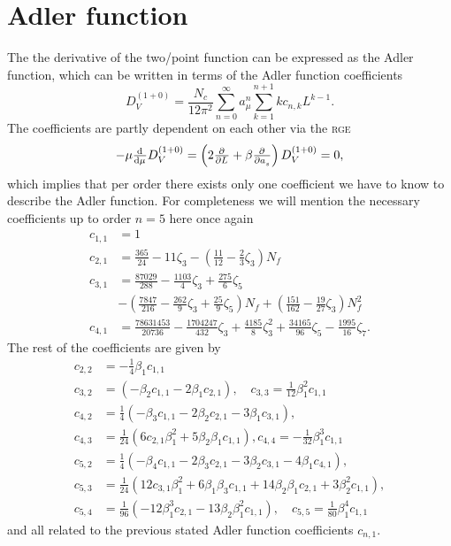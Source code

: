 \documentclass[../../index.tex]{subfiles}
\begin{document}
  \section{Adler function}
  The the derivative of the two\-/point function can be expressed as the Adler
  function, which can be written in terms of the Adler function coefficients
  \begin{equation}
    D_V^{(1+0)} =  \frac{N_c}{12 \pi^2}
    \sum_{n=0}^\infty a_\mu^n \sum_{k=1}^{n+1} k c_{n,k} L^{k-1}.
  \end{equation}
  The coefficients are partly dependent on each other via the \textsc{rge} 
  \begin{equation}
    -\mu \od{}{\mu} D_V^{(1+0)} = \left( 2\pd{}{L} + \beta \pd{}{a_s} \right) D_V^{(1+0)} = 0,
  \end{equation}
  which implies that per order there exists only one coefficient we have to know
  to describe the Adler function. For completeness we will mention the necessary
  coefficients up to order \(n = 5\) here once again
  \begin{equation}
    \begin{split}
      c_{1,1} &= 1 \\
      c_{2,1} &= \frac{365}{24} - 11 \zeta_3 - \left( \frac{11}{12} - \frac{2}{3}\zeta_3 \right) N_f \\
      c_{3,1} &= \frac{87029}{288} - \frac{1103}{4} \zeta_3 + \frac{275}{6}\zeta_5 \\
      &- \left( \frac{7847}{216} - \frac{262}{9} \zeta_3 + \frac{25}{9} \zeta_5 \right) N_f + \left( \frac{151}{162} - \frac{19}{27}\zeta_3\right)N_f^2 \\
      c_{4,1} &= \frac{78631453}{20736} - \frac{1704247}{432}\zeta_3 +
      \frac{4185}{8}\zeta_3^2 + \frac{34165}{96}\zeta_5 - \frac{1995}{16}\zeta_7.
    \end{split}
  \end{equation}
  The rest of the coefficients are given by
  \begin{equation}
    \begin{split}
      c_{2,2} &= -\frac{1}{4} \beta_1 c_{1,1} \\
      c_{3,2} &= (-\beta_2 c_{1,1} - 2\beta_1 c_{2,1}), \quad c_{3,3} = \frac{1}{12}\beta_1^2c_{1,1} \\
      c_{4,2} &= \frac{1}{4}(-\beta_3 c_{1,1} - 2\beta_2c_{2,1} - 3\beta_1 c_{3,1}), \\
      c_{4,3} &= \frac{1}{24}(6 c_{2,1} \beta_1^2 + 5 \beta_2\beta_1 c_{1,1}), c_{4,4} = -\frac{1}{32}\beta_1^3 c_{1,1} \\
      c_{5,2} &= \frac{1}{4}(-\beta_4 c_{1,1} - 2\beta_3 c_{2,1} - 3\beta_2 c_{3,1} - 4 \beta_1 c_{4,1}), \\
      c_{5,3} &= \frac{1}{24}(12 c_{3,1} \beta_1^2 + 6 \beta_1 \beta_3 c_{1,1} + 14 \beta_2 \beta_1 c_{2,1} + 3 \beta_2^2 c_{1,1}), \\ 
      c_{5,4} &= \frac{1}{96} (-12 \beta_1^3c_{2,1} - 13 \beta_2 \beta_1^2 c_{1,1}), \quad c_{5,5} = \frac{1}{80} \beta_1^4 c_{1,1}
    \end{split}
  \end{equation}
  and all related to the previous stated Adler function coefficients \(c_{n, 1}\).
  
\end{document}

